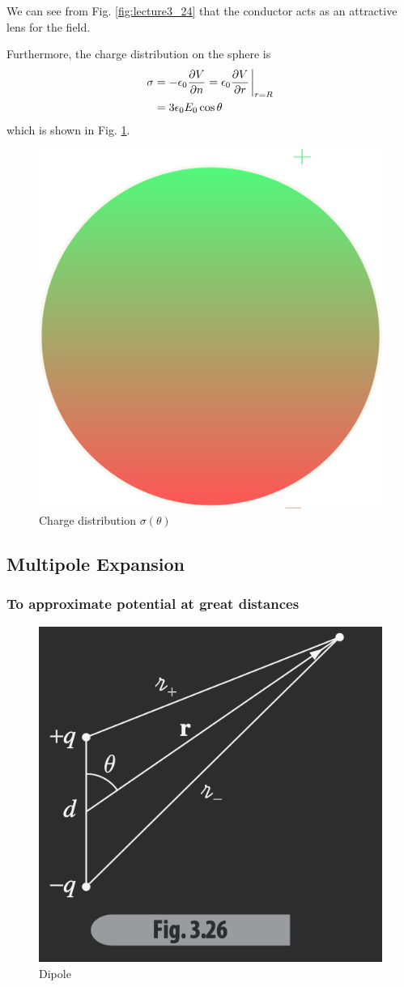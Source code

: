 \documentclass[../main.tex]{subfiles}
\begin{document}
We can see from Fig. \ref{fig:lecture3_24} that the conductor acts as an attractive lens for the field.

Furthermore, the charge distribution on the sphere is
\begin{align*}
    \sigma &= -\epsilon_0 \pdv{V}{n} = \epsilon_0 \pdv{V}{r} \eval_{r = R} \\
    &= 3 \epsilon_0 E_0 \cos\theta
\end{align*}
which is shown in Fig. \ref{fig:lecture3_24b}.
\begin{figure}[ht]
    \centering
    \includegraphics[width=0.4\linewidth]{fig3_24b.png}
    \caption{Charge distribution $\sigma(\theta)$}
    \label{fig:lecture3_24b}
\end{figure}

\newpage
\subsection{Multipole Expansion}

\subsubsection{To approximate potential at great distances}

\begin{figure}[ht]
    \centering
    \includegraphics[width=0.4\linewidth]{fig3_26.png}
    \caption{Dipole}
    \label{fig:lec3_26}
\end{figure}
\end{document}
